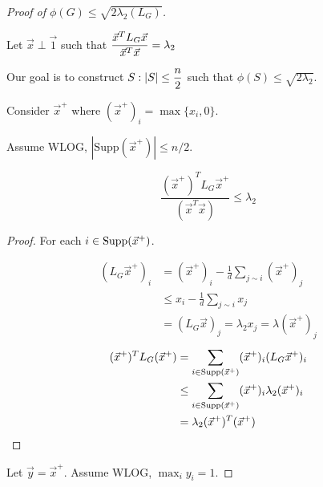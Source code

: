 \begin{proof}[Proof of  $\phi(G) \leq \sqrt{2\lambda_2(L_G)} $]
    \,

    Let  $ \vec{x}\perp \vec{1} $ such that  $\displaystyle\frac{\vec{x}^TL_G\vec{x}}{\vec{x}^T\vec{x}}=\lambda_2 $  
    
    Our goal is to construct  $ S:|S| \leq \displaystyle\frac{n}{2} $ such that  $ \phi(S) \leq \sqrt{2\lambda_2} $.
    
    Consider  $ \vec{x}^+ $ where  $ (\vec{x}^+)_i=\max\{x_i,0\} $.
    
    Assume WLOG,  $ |\mathrm{Supp}(\vec{x}^+)| \leq n/2 $.
    
    \begin{claim}
        \[\frac{(\vec{x}^+)^TL_G\vec{x}^+}{(\vec{x}^T\vec{x})} \leq \lambda_2\]
    \end{claim}
    \begin{proof}
        For each  $ i\in \mathrm{Supp}(\vec{x}^+) $.
        
        \[\begin{aligned}
            \left(L_G\vec{x}^+\right)_i&=(\vec{x}^+)_i-\frac{1}{d}\sum_{j\sim i}(\vec{x}^+)_j\\
            & \leq x_i-\frac{1}{d}\sum_{j\sim i}x_j\\
            &=(L_G\vec{x})_j=\lambda_2x_j=\lambda(\vec{x}^+)_j
        \end{aligned}\]
        \[\begin{aligned}
            (\vec{x}^+)^TL_G(\vec{x}^+)&=\sum_{i\in \mathrm{Supp}(\vec{x}^+)}(\vec{x}^+)_i(L_G\vec{x}^+)_i\\
            & \leq \sum_{i\in \mathrm{Supp}(\vec{x}^+)}(\vec{x}^+)_i\lambda_2(\vec{x}^+)_i\\
            &=\lambda_2(\vec{x}^+)^T(\vec{x}^+)
        \end{aligned}\]
    \end{proof}
    Let  $ \vec{y}=\vec{x}^+ $. Assume WLOG,  $ \max_i y_i=1 $.
    

\end{proof}

